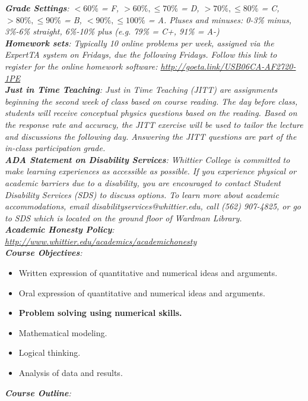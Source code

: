 \documentclass[10pt]{article}
\begin{document}
\textit{\textbf{Grade Settings}: $<60\%$ = F, $>60\%,\leq 70\%$ = D, $>70\%,\leq80\%$ = C, $>80\%,\leq 90\%$ = B, $<90\%,\leq 100\%$ = A.  Pluses and minuses: 0-3\% minus, 3\%-6\% straight, 6\%-10\% plus (e.g. 79\% = C+, 91\% = A-)} \\
\textit{\textbf{Homework sets}: Typically 10 online problems per week, assigned via the ExpertTA system on Fridays, due the following Fridays.  Follow this link to register for the online homework software: \url{http://goeta.link/USB06CA-AF2720-1PE}} \\
\textit{\textbf{Just in Time Teaching}: Just in Time Teaching (JITT) are assignments beginning the second week of class based on course reading.  The day before class, students will receive conceptual physics questions based on the reading.  Based on the response rate and accuracy, the JITT exercise will be used to tailor the lecture and discussions the following day.  Answering the JITT questions are part of the in-class participation grade.} \\
\textit{\textbf{ADA Statement on Disability Services}: Whittier College is committed to make learning experiences as accessible as possible. If you experience physical or academic barriers due to a disability, you are encouraged to contact Student Disability Services (SDS) to discuss options. To learn more about academic accommodations, email disabilityservices@whittier.edu, call (562) 907-4825, or go to SDS which is located on the ground floor of Wardman Library.} \\
\textit{\textbf{Academic Honesty Policy}: \url{http://www.whittier.edu/academics/academichonesty}} \\
\textit{\textbf{Course Objectives}:}
\begin{itemize}
\item Written expression of quantitative and numerical ideas and arguments.
\item Oral expression of quantitative and numerical ideas and arguments.
\item \textbf{Problem solving using numerical skills.}
\item Mathematical modeling.
\item Logical thinking.
\item Analysis of data and results.
\end{itemize}
\textit{\textbf{Course Outline}:}
\end{document}
